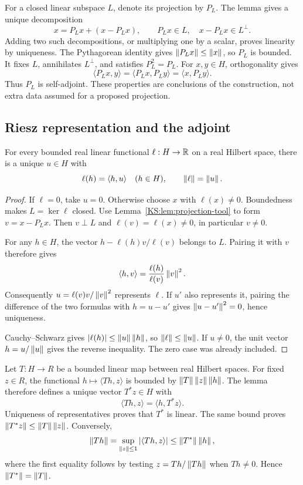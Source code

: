 \documentclass[11pt,oneside,openany]{book}
\numberwithin{equation}{section}
\begin{document}
For a closed linear subspace \(L\), denote its projection by \(P_L\). The lemma gives a unique decomposition
\[
 x=P_Lx+(x-P_Lx),\qquad P_Lx\in L,\quad x-P_Lx\in L^\perp.
\]
Adding two such decompositions, or multiplying one by a scalar, proves linearity by uniqueness. The Pythagorean identity gives \(\left\lVert P_Lx\right\rVert\le\left\lVert x\right\rVert\), so \(P_L\) is bounded. It fixes \(L\), annihilates \(L^\perp\), and satisfies \(P_L^2=P_L\). For \(x,y\in H\), orthogonality gives
\[
 \langle P_Lx,y\rangle=\langle P_Lx,P_Ly\rangle
 =\langle x,P_Ly\rangle.
\]
Thus \(P_L\) is self-adjoint. These properties are conclusions of the construction, not extra data assumed for a proposed projection.

\subsection{Riesz representation and the adjoint}
\begin{KSlemma}\label{KS:lem:riesz-tool}
For every bounded real linear functional \(\ell:H\to\mathbb R\) on a real Hilbert space, there is a unique \(u\in H\) with
\[
 \ell(h)=\langle h,u\rangle\quad(h\in H),\qquad \left\lVert\ell\right\rVert=\left\lVert u\right\rVert.
\]
\end{KSlemma}
\begin{proof}
If \(\ell=0\), take \(u=0\). Otherwise choose \(x\) with \(\ell(x)\ne0\). Boundedness makes \(L=\ker\ell\) closed. Use Lemma~\ref{KS:lem:projection-tool} to form \(v=x-P_Lx\). Then \(v\perp L\) and \(\ell(v)=\ell(x)\ne0\), in particular \(v\ne0\).

For any \(h\in H\), the vector \(h-\ell(h)v/\ell(v)\) belongs to \(L\). Pairing it with \(v\) therefore gives
\[
 \langle h,v\rangle=\frac{\ell(h)}{\ell(v)}\left\lVert v\right\rVert^2.
\]
Consequently \(u=\ell(v)v/\left\lVert v\right\rVert^2\) represents \(\ell\). If \(u'\) also represents it, pairing the difference of the two formulas with \(h=u-u'\) gives \(\left\lVert u-u'\right\rVert^2=0\), hence uniqueness.

Cauchy--Schwarz gives \(|\ell(h)|\le\left\lVert u\right\rVert\left\lVert h\right\rVert\), so \(\left\lVert\ell\right\rVert\le\left\lVert u\right\rVert\). If \(u\ne0\), the unit vector \(h=u/\left\lVert u\right\rVert\) gives the reverse inequality. The zero case was already included.
\end{proof}

Let \(T:H\to R\) be a bounded linear map between real Hilbert spaces. For fixed \(z\in R\), the functional \(h\mapsto\langle Th,z\rangle\) is bounded by \(\left\lVert T\right\rVert\left\lVert z\right\rVert\left\lVert h\right\rVert\). The lemma therefore defines a unique vector \(T^*z\in H\) with
\[
 \langle Th,z\rangle=\langle h,T^*z\rangle.
\]
Uniqueness of representatives proves that \(T^*\) is linear. The same bound proves \(\left\lVert T^*z\right\rVert\le\left\lVert T\right\rVert\left\lVert z\right\rVert\). Conversely,
\[
 \left\lVert Th\right\rVert=\sup_{\left\lVert z\right\rVert\le1}|\langle Th,z\rangle|
 \le\left\lVert T^*\right\rVert\left\lVert h\right\rVert,
\]
where the first equality follows by testing \(z=Th/\left\lVert Th\right\rVert\) when \(Th\ne0\). Hence \(\left\lVert T^*\right\rVert=\left\lVert T\right\rVert\).
\end{document}
